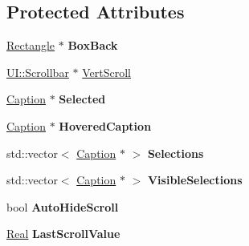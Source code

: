 \subsection*{Protected Attributes}
\begin{DoxyCompactItemize}
\item 
\hypertarget{classphys_1_1UI_1_1ListBox_a07de9457be75ad3b9ff21683d99d545b}{
\hyperlink{classphys_1_1UI_1_1Rectangle}{Rectangle} $\ast$ {\bfseries BoxBack}}
\label{d0/d28/classphys_1_1UI_1_1ListBox_a07de9457be75ad3b9ff21683d99d545b}

\item 
\hyperlink{classphys_1_1UI_1_1Scrollbar}{UI::Scrollbar} $\ast$ \hyperlink{classphys_1_1UI_1_1ListBox_ab2b012b345ff4bb1a5b228fef88d895c}{VertScroll}
\item 
\hypertarget{classphys_1_1UI_1_1ListBox_a62d0841248552db1479b8be601c3a5c3}{
\hyperlink{classphys_1_1UI_1_1Caption}{Caption} $\ast$ {\bfseries Selected}}
\label{d0/d28/classphys_1_1UI_1_1ListBox_a62d0841248552db1479b8be601c3a5c3}

\item 
\hypertarget{classphys_1_1UI_1_1ListBox_a963c94fef825d15befd0058c70a1d2df}{
\hyperlink{classphys_1_1UI_1_1Caption}{Caption} $\ast$ {\bfseries HoveredCaption}}
\label{d0/d28/classphys_1_1UI_1_1ListBox_a963c94fef825d15befd0058c70a1d2df}

\item 
\hypertarget{classphys_1_1UI_1_1ListBox_a5a514bce001102aef65c79a0e810d11b}{
std::vector$<$ \hyperlink{classphys_1_1UI_1_1Caption}{Caption} $\ast$ $>$ {\bfseries Selections}}
\label{d0/d28/classphys_1_1UI_1_1ListBox_a5a514bce001102aef65c79a0e810d11b}

\item 
\hypertarget{classphys_1_1UI_1_1ListBox_adb069b745918dd8ea9678a0fc199bf1c}{
std::vector$<$ \hyperlink{classphys_1_1UI_1_1Caption}{Caption} $\ast$ $>$ {\bfseries VisibleSelections}}
\label{d0/d28/classphys_1_1UI_1_1ListBox_adb069b745918dd8ea9678a0fc199bf1c}

\item 
\hypertarget{classphys_1_1UI_1_1ListBox_a45271c1bffa336d7c86ce9c70b83e000}{
bool {\bfseries AutoHideScroll}}
\label{d0/d28/classphys_1_1UI_1_1ListBox_a45271c1bffa336d7c86ce9c70b83e000}

\item 
\hypertarget{classphys_1_1UI_1_1ListBox_a8a68a1177b1a273ada009245533a808c}{
\hyperlink{namespacephys_af7eb897198d265b8e868f45240230d5f}{Real} {\bfseries LastScrollValue}}
\label{d0/d28/classphys_1_1UI_1_1ListBox_a8a68a1177b1a273ada009245533a808c}


\end{DoxyCompactItemize}
